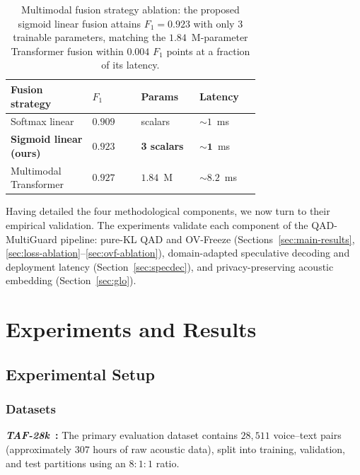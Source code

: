 \documentclass[a4paper,fleqn]{cas-sc}
\begin{document}
\begin{table}
\centering
\caption{Multimodal fusion strategy ablation: the proposed sigmoid linear fusion attains $F_1 = 0.923$ with only $3$ trainable parameters, matching the $1.84$~M-parameter Transformer fusion within $0.004$ $F_1$ points at a fraction of its latency.}
\label{tab:fusion_ablation-en}
\small
\renewcommand{\arraystretch}{1.1}
\begin{tabular}{>{\centering\arraybackslash}p{0.25\linewidth}>{\centering\arraybackslash}p{0.15\linewidth}>{\centering\arraybackslash}p{0.15\linewidth}>{\centering\arraybackslash}p{0.15\linewidth}}
\toprule
\textbf{Fusion strategy} & \textbf{$F_1$} & \textbf{Params} & \textbf{Latency} \\
\midrule
Softmax linear & $0.909$ & 3 scalars & $\sim 1$~ms \\
\textbf{Sigmoid linear (ours)} & $\mathbf{0.923}$ & \textbf{3 scalars} & $\mathbf{\sim 1}$~ms \\
Multimodal Transformer & $0.927$ & $1.84$~M & $\sim 8.2$~ms \\
\bottomrule
\end{tabular}
\end{table}

Having detailed the four methodological components, we now turn to their empirical validation. The experiments validate each component of the QAD-MultiGuard pipeline: pure-KL QAD and OV-Freeze (Sections~\ref{sec:main-results}, \ref{sec:loss-ablation}--\ref{sec:ovf-ablation}), domain-adapted speculative decoding and deployment latency (Section~\ref{sec:specdec}), and privacy-preserving acoustic embedding (Section~\ref{sec:glo}).

\section{Experiments and Results}\label{sec:experiments}
\subsection{Experimental Setup}

\subsubsection{Datasets}

\textbf{\textit{TAF-28k}~\citep{1}:} The primary evaluation dataset contains $28{,}511$ voice--text pairs (approximately $307\text{~hours}$ of raw acoustic data), split into training, validation, and test partitions using an $8{:}1{:}1$ ratio.
\end{document}
